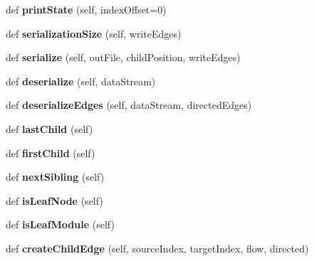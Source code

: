 \begin{DoxyCompactItemize}
\mbox{\label{classdsmacc_1_1graph_1_1infomap_1_1TreeIterator_a2b019083ac9cdac27caeb039eb06d398}} 
def {\bfseries print\+State} (self, index\+Offset=0)
\item 
\mbox{\label{classdsmacc_1_1graph_1_1infomap_1_1TreeIterator_aab4028eb88aae9c997fde952bacdb4b2}} 
def {\bfseries serialization\+Size} (self, write\+Edges)
\item 
\mbox{\label{classdsmacc_1_1graph_1_1infomap_1_1TreeIterator_a8e6a016b68231d2c8795b95cb20de42e}} 
def {\bfseries serialize} (self, out\+File, child\+Position, write\+Edges)
\item 
\mbox{\label{classdsmacc_1_1graph_1_1infomap_1_1TreeIterator_a8e7af659d18e7a5aca0c97ae0d39d78c}} 
def {\bfseries deserialize} (self, data\+Stream)
\item 
\mbox{\label{classdsmacc_1_1graph_1_1infomap_1_1TreeIterator_a7f6e0500c5e8bc2fbd3fa472dd52dc11}} 
def {\bfseries deserialize\+Edges} (self, data\+Stream, directed\+Edges)
\item 
\mbox{\label{classdsmacc_1_1graph_1_1infomap_1_1TreeIterator_a5a1c03444ab423fa1f89785c3664006b}} 
def {\bfseries last\+Child} (self)
\item 
\mbox{\label{classdsmacc_1_1graph_1_1infomap_1_1TreeIterator_aedf1affbfd2a2f6cf52d21a641ad379f}} 
def {\bfseries first\+Child} (self)
\item 
\mbox{\label{classdsmacc_1_1graph_1_1infomap_1_1TreeIterator_a258adb679aa92687308d850a0cf98c05}} 
def {\bfseries next\+Sibling} (self)
\item 
\mbox{\label{classdsmacc_1_1graph_1_1infomap_1_1TreeIterator_a174b579f791fbdf9adbed0bbf93ff134}} 
def {\bfseries is\+Leaf\+Node} (self)
\item 
\mbox{\label{classdsmacc_1_1graph_1_1infomap_1_1TreeIterator_a8c2e2433adb3608249dcf6c7d537cff1}} 
def {\bfseries is\+Leaf\+Module} (self)
\item 
\mbox{\label{classdsmacc_1_1graph_1_1infomap_1_1TreeIterator_a98b4a8277e9d206499082e360d366b6d}} 
def {\bfseries create\+Child\+Edge} (self, source\+Index, target\+Index, flow, directed)
\end{DoxyCompactItemize}
